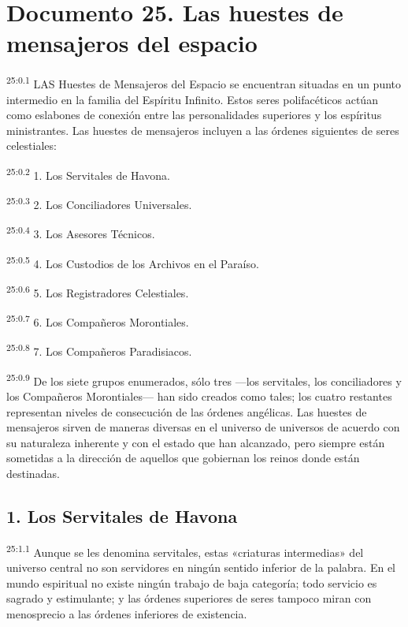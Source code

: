 \chapter{Documento 25. Las huestes de mensajeros del espacio}
\par
\textsuperscript{25:0.1} LAS Huestes de Mensajeros del Espacio se encuentran situadas en un punto intermedio en la familia del Espíritu Infinito. Estos seres polifacéticos actúan como eslabones de conexión entre las personalidades superiores y los espíritus ministrantes. Las huestes de mensajeros incluyen a las órdenes siguientes de seres celestiales:

\par
\textsuperscript{25:0.2} 1. Los Servitales de Havona.

\par
\textsuperscript{25:0.3} 2. Los Conciliadores Universales.

\par
\textsuperscript{25:0.4} 3. Los Asesores Técnicos.

\par
\textsuperscript{25:0.5} 4. Los Custodios de los Archivos en el Paraíso.

\par
\textsuperscript{25:0.6} 5. Los Registradores Celestiales.

\par
\textsuperscript{25:0.7} 6. Los Compañeros Morontiales.

\par
\textsuperscript{25:0.8} 7. Los Compañeros Paradisiacos.

\par
\textsuperscript{25:0.9} De los siete grupos enumerados, sólo tres ---los servitales, los conciliadores y los Compañeros Morontiales--- han sido creados como tales; los cuatro restantes representan niveles de consecución de las órdenes angélicas. Las huestes de mensajeros sirven de maneras diversas en el universo de universos de acuerdo con su naturaleza inherente y con el estado que han alcanzado, pero siempre están sometidas a la dirección de aquellos que gobiernan los reinos donde están destinadas.

\section*{1. Los Servitales de Havona}
\par
\textsuperscript{25:1.1} Aunque se les denomina servitales, estas «criaturas intermedias» del universo central no son servidores en ningún sentido inferior de la palabra. En el mundo espiritual no existe ningún trabajo de baja categoría; todo servicio es sagrado y estimulante; y las órdenes superiores de seres tampoco miran con menosprecio a las órdenes inferiores de existencia.

